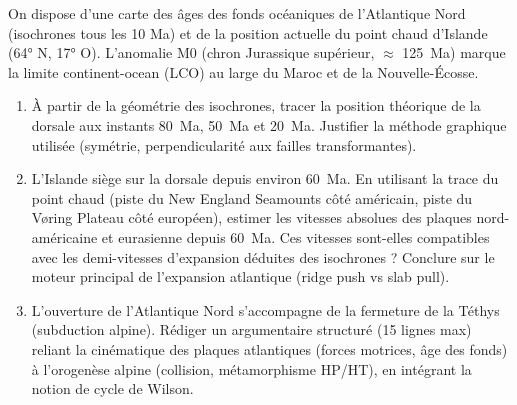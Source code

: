 \documentclass[11pt]{article}
\begin{document}
\begin{exercice}
On dispose d'une carte des âges des fonds océaniques de l'Atlantique Nord (isochrones tous les 10 Ma) et de la position actuelle du point chaud d'Islande (64° N, 17° O). L'anomalie M0 (chron Jurassique supérieur, $\approx$ \SI{125}{Ma}) marque la limite continent-ocean (LCO) au large du Maroc et de la Nouvelle-Écosse.

\begin{enumerate}
    \item À partir de la géométrie des isochrones, tracer la position théorique de la dorsale aux instants \SI{80}{Ma}, \SI{50}{Ma} et \SI{20}{Ma}. Justifier la méthode graphique utilisée (symétrie, perpendicularité aux failles transformantes).
    \item L'Islande siège sur la dorsale depuis environ \SI{60}{Ma}. En utilisant la trace du point chaud (piste du New England Seamounts côté américain, piste du Vøring Plateau côté européen), estimer les vitesses absolues des plaques nord-américaine et eurasienne depuis \SI{60}{Ma}. Ces vitesses sont-elles compatibles avec les demi-vitesses d'expansion déduites des isochrones ? Conclure sur le moteur principal de l'expansion atlantique (ridge push vs slab pull).
    \item L'ouverture de l'Atlantique Nord s'accompagne de la fermeture de la Téthys (subduction alpine). Rédiger un argumentaire structuré (15 lignes max) reliant la cinématique des plaques atlantiques (forces motrices, âge des fonds) à l'orogenèse alpine (collision, métamorphisme HP/HT), en intégrant la notion de cycle de Wilson.
\end{enumerate}
\end{exercice}
\end{document}
